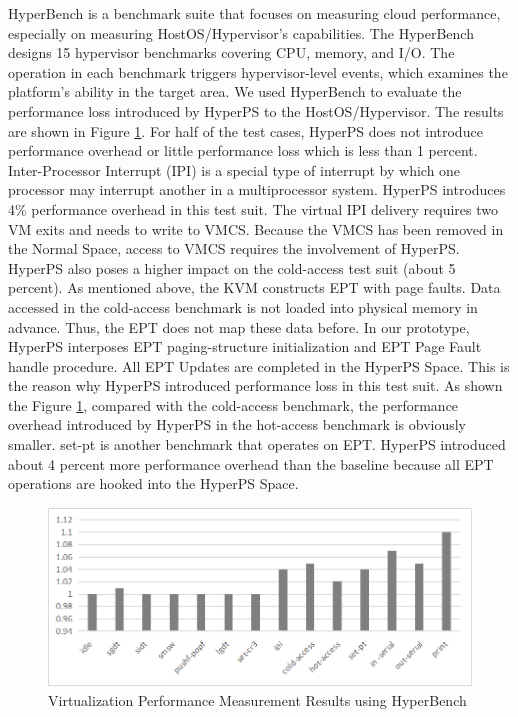 HyperBench is a benchmark suite that focuses on measuring cloud performance, especially on measuring HostOS/Hypervisor's capabilities. 
The HyperBench designs 15 hypervisor benchmarks covering CPU, memory, and I/O. The operation in each benchmark triggers hypervisor-level events, which examines the platform's ability in the target area. We used HyperBench to evaluate the performance loss introduced by HyperPS to the HostOS/Hypervisor.
The results are shown in Figure \ref{fig:hyperbench}. For half of the test cases, HyperPS does not introduce performance overhead or little performance loss which is less than 1 percent. 
Inter-Processor Interrupt (IPI) is a special type of interrupt by which one processor may interrupt another in a multiprocessor system. 
HyperPS introduces 4\% performance overhead in this test suit. 
The virtual IPI delivery requires two VM exits and needs to write to VMCS. Because the VMCS has been removed in the Normal Space, access to VMCS requires the involvement of HyperPS.  
HyperPS also poses a higher impact on the cold-access test suit (about 5 percent). 
As mentioned above, the KVM constructs EPT with page faults. Data accessed in the cold-access benchmark is not loaded into physical memory in advance. Thus, the EPT does not map these data before. In our prototype, HyperPS interposes EPT paging-structure initialization and EPT Page Fault handle procedure. 
All EPT Updates are completed in the HyperPS Space. This is the reason why HyperPS introduced performance loss in this test suit. 
As shown the Figure \ref{fig:hyperbench}, compared with the cold-access benchmark, the performance overhead introduced by HyperPS in the hot-access benchmark is obviously smaller. 
set-pt is another benchmark that operates on EPT. HyperPS introduced about 4 percent more performance overhead than the baseline because all EPT operations are hooked into the HyperPS Space. 

\begin{figure}[htpb]
    \centering
    \includegraphics[width=0.9\linewidth]{./IMG/hyperbench.png}
    \caption{Virtualization Performance Measurement Results using HyperBench}
    \label{fig:hyperbench}
\end{figure}



